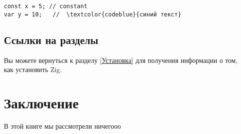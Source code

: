\documentclass[a4paper, twoside, openany]{book}
\begin{document}
\begin{lstlisting}[language=Zig, caption={Пример на Zig}]
const x = 5; // constant
var y = 10;   //  \textcolor{codeblue}{синий текст}
\end{lstlisting}

\section{Ссылки на разделы}
 \fontsize{14pt}{14pt}\selectfont
Вы можете вернуться к разделу \ref{Установка} для получения информации о том, как установить Zig.

\chapter{Заключение}
 \fontsize{14pt}{14pt}\selectfont
В этой книге мы рассмотрели ничегооо 
\end{document}
